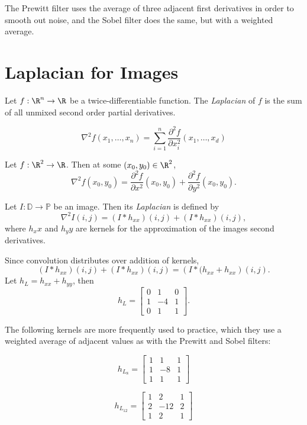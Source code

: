\documentclass[12pt]{article}
\begin{document}
The Prewitt filter uses the average of three adjacent first derivatives in order to smooth out noise, and the Sobel filter does the same, but with a weighted average.

\section{Laplacian for Images}

\begin{defn}
    Let $f: \R^n \to \R$ be a twice-differentiable function. The \emph{Laplacian} of $f$ is the sum of all unmixed second order partial derivatives.

    \[\nabla^2f(x_1, \ldots, x_n) = \sum_{i=1}^n \frac{\partial^2f}{\partial x_i^2}(x_1, \ldots, x_d)\]
\end{defn}

\begin{exmp}
    Let $f: \R^2 \to \R$. Then at some $(x_0, y_0) \in \R^2$, \[\nabla^2 f(x_0, y_0) = \frac{\partial^2f}{\partial x^2}(x_0, y_0) + \frac{\partial^2f}{\partial y^2}(x_0, y_0).\]
\end{exmp}

\begin{defn}
    Let $I: \mathbb{D} \to \mathbb{P}$ be an image. Then its \emph{Laplacian} is defined by \[\nabla^2I(i, j) = (I * h_{xx})(i, j) + (I * h_{xx})(i, j),\] where $h_xx$ and $h_yy$ are kernels for the approximation of the images second derivatives.
\end{defn}

Since convolution distributes over addition of kernels, \[(I * h_{xx})(i, j) + (I * h_{xx})(i, j) = \left(I * (h_{xx} + h_{xx}\right)(i, j).\] Let $h_L = h_{xx} + h_{yy}$, then
\[h_L = \begin{bmatrix}
    0 & 1 & 0 \\ 1 & -4 & 1 \\ 0 & 1 & 1
\end{bmatrix}.\]

The following kernels are more frequently used to practice, which they use a weighted average of adjacent values as with the Prewitt and Sobel filters:

\[h_{L_8} = \begin{bmatrix}
    1 & 1 & 1 \\ 1 & -8 & 1 \\ 1 & 1 & 1
\end{bmatrix}\]

\[h_{L_12} = \begin{bmatrix}
    1 & 2 & 1 \\ 2 & -12 & 2 \\ 1 & 2 & 1
\end{bmatrix}\]
\end{document}
